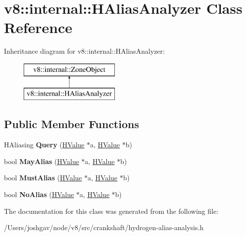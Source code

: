 \hypertarget{classv8_1_1internal_1_1_h_alias_analyzer}{}\section{v8\+:\+:internal\+:\+:H\+Alias\+Analyzer Class Reference}
\label{classv8_1_1internal_1_1_h_alias_analyzer}
Inheritance diagram for v8\+:\+:internal\+:\+:H\+Alias\+Analyzer\+:\begin{figure}[H]
\begin{center}
\leavevmode
\includegraphics[height=2.000000cm]{classv8_1_1internal_1_1_h_alias_analyzer}
\end{center}
\end{figure}
\subsection*{Public Member Functions}
\begin{DoxyCompactItemize}
\item 
H\+Aliasing {\bfseries Query} (\hyperlink{classv8_1_1internal_1_1_h_value}{H\+Value} $\ast$a, \hyperlink{classv8_1_1internal_1_1_h_value}{H\+Value} $\ast$b)\hypertarget{classv8_1_1internal_1_1_h_alias_analyzer_ad2d71024e2af0a08aaddf1a1dffd7bd0}{}\label{classv8_1_1internal_1_1_h_alias_analyzer_ad2d71024e2af0a08aaddf1a1dffd7bd0}

\item 
bool {\bfseries May\+Alias} (\hyperlink{classv8_1_1internal_1_1_h_value}{H\+Value} $\ast$a, \hyperlink{classv8_1_1internal_1_1_h_value}{H\+Value} $\ast$b)\hypertarget{classv8_1_1internal_1_1_h_alias_analyzer_abf51f74e8e1f0b8c9b2f0c52599c6ef8}{}\label{classv8_1_1internal_1_1_h_alias_analyzer_abf51f74e8e1f0b8c9b2f0c52599c6ef8}

\item 
bool {\bfseries Must\+Alias} (\hyperlink{classv8_1_1internal_1_1_h_value}{H\+Value} $\ast$a, \hyperlink{classv8_1_1internal_1_1_h_value}{H\+Value} $\ast$b)\hypertarget{classv8_1_1internal_1_1_h_alias_analyzer_a3dd5a9de48296707c55649b4e5321e90}{}\label{classv8_1_1internal_1_1_h_alias_analyzer_a3dd5a9de48296707c55649b4e5321e90}

\item 
bool {\bfseries No\+Alias} (\hyperlink{classv8_1_1internal_1_1_h_value}{H\+Value} $\ast$a, \hyperlink{classv8_1_1internal_1_1_h_value}{H\+Value} $\ast$b)\hypertarget{classv8_1_1internal_1_1_h_alias_analyzer_afbf1c6f713353d71032a10cd47a7529f}{}\label{classv8_1_1internal_1_1_h_alias_analyzer_afbf1c6f713353d71032a10cd47a7529f}

\end{DoxyCompactItemize}


The documentation for this class was generated from the following file\+:\begin{DoxyCompactItemize}
\item 
/\+Users/joshgav/node/v8/src/crankshaft/hydrogen-\/alias-\/analysis.\+h\end{DoxyCompactItemize}
